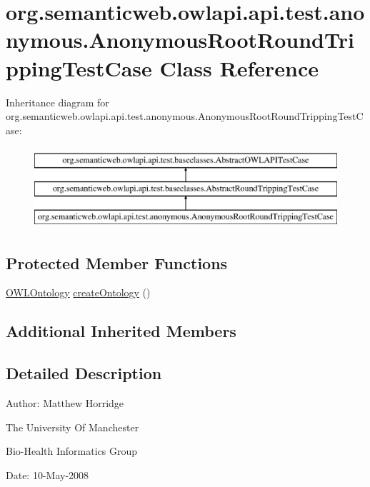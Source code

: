 \hypertarget{classorg_1_1semanticweb_1_1owlapi_1_1api_1_1test_1_1anonymous_1_1_anonymous_root_round_tripping_test_case}{\section{org.\-semanticweb.\-owlapi.\-api.\-test.\-anonymous.\-Anonymous\-Root\-Round\-Tripping\-Test\-Case Class Reference}
\label{classorg_1_1semanticweb_1_1owlapi_1_1api_1_1test_1_1anonymous_1_1_anonymous_root_round_tripping_test_case}
}
Inheritance diagram for org.\-semanticweb.\-owlapi.\-api.\-test.\-anonymous.\-Anonymous\-Root\-Round\-Tripping\-Test\-Case\-:\begin{figure}[H]
\begin{center}
\leavevmode
\includegraphics[height=3.000000cm]{classorg_1_1semanticweb_1_1owlapi_1_1api_1_1test_1_1anonymous_1_1_anonymous_root_round_tripping_test_case}
\end{center}
\end{figure}
\subsection*{Protected Member Functions}
\begin{DoxyCompactItemize}
\item 
\hyperlink{interfaceorg_1_1semanticweb_1_1owlapi_1_1model_1_1_o_w_l_ontology}{O\-W\-L\-Ontology} \hyperlink{classorg_1_1semanticweb_1_1owlapi_1_1api_1_1test_1_1anonymous_1_1_anonymous_root_round_tripping_test_case_a1c7f7a40850d0171cb3905d8bb87acaa}{create\-Ontology} ()
\end{DoxyCompactItemize}
\subsection*{Additional Inherited Members}


\subsection{Detailed Description}
Author\-: Matthew Horridge\par
 The University Of Manchester\par
 Bio-\/\-Health Informatics Group\par
 Date\-: 10-\/\-May-\/2008\par
 \par
 


